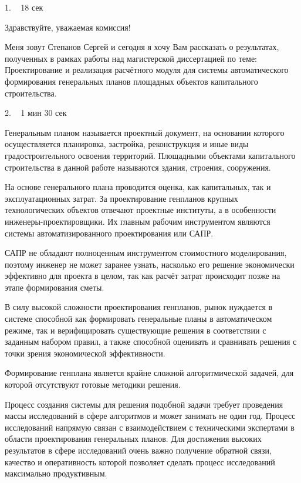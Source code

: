 \documentclass[11pt]{article}
\begin{document}
    1. ~ 18 сек

    Здравствуйте, уважаемая комиссия!

    Меня зовут Степанов Сергей и сегодня я хочу Вам рассказать о результатах,
    полученных в рамках работы над магистерской диссертацией по теме:
    Проектирование и реализация расчётного модуля для системы автоматического формирования
    генеральных планов площадных объектов капитального строительства.


    2. ~ 1 мин 30 сек

    Генеральным планом называется
    проектный документ, на основании которого осуществляется планировка,
    застройка, реконструкция и иные виды градостроительного освоения территорий.
    Площадными объектами капитального строительства в данной работе называются здания, строения, сооружения.

    На основе генерального плана проводится оценка, как капитальных, так и эксплуатационных затрат.
    За проектирование генпланов крупных технологических объектов отвечают проектные институты,
    а в особенности инженеры-проектировщики. Их главным рабочим инструментом
    являются системы автоматизированного проектирования или САПР.

    САПР не обладают полноценным инструментом стоимостного моделирования,
    поэтому инженер не может заранее узнать,
    насколько его решение экономически эффективно для проекта в целом,
    так как расчёт затрат происходит позже на этапе формирования сметы.

    В силу высокой сложности проектирования генпланов,
    рынок нуждается в системе способной как формировать генеральные планы в автоматическом режиме,
    так и верифицировать существующие решения в соответствии с заданным набором правил,
    а также способной оценивать и сравнивать решения с точки зрения экономической эффективности.

    Формирование генплана является крайне сложной алгоритмической задачей,
    для которой отсутствуют готовые методики решения.

    Процесс создания системы для решения подобной задачи требует
    проведения массы исследований в сфере алгоритмов и может занимать не один год.
    Процесс исследований напрямую связан с взаимодействием с техническими экспертами
    в области проектирования генеральных планов.
    Для достижения высоких результатов в сфере исследований очень важно получение обратной связи,
    качество и оперативность которой позволяет сделать процесс исследований максимально продуктивным.
\end{document}
